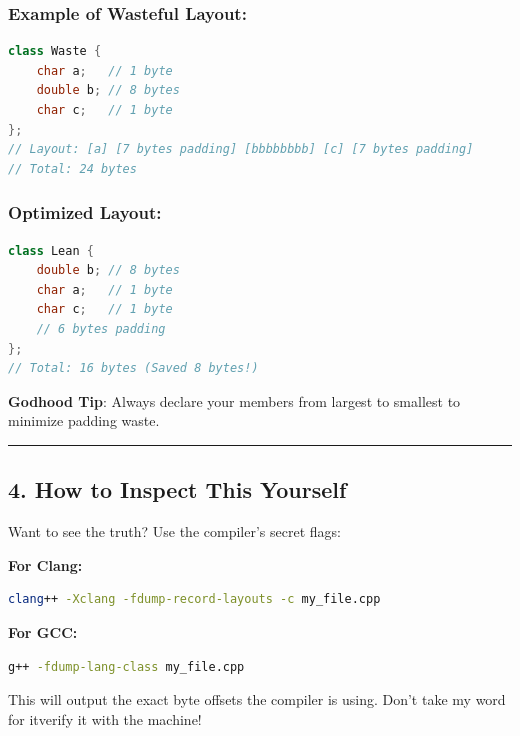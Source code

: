 \hypertarget{example-of-wasteful-layout}{%
\subsubsection{Example of Wasteful
Layout:}\label{example-of-wasteful-layout}}

\begin{lstlisting}[language={C++}]
class Waste {
    char a;   // 1 byte
    double b; // 8 bytes
    char c;   // 1 byte
};
// Layout: [a] [7 bytes padding] [bbbbbbbb] [c] [7 bytes padding]
// Total: 24 bytes
\end{lstlisting}

\hypertarget{optimized-layout}{%
\subsubsection{Optimized Layout:}\label{optimized-layout}}

\begin{lstlisting}[language={C++}]
class Lean {
    double b; // 8 bytes
    char a;   // 1 byte
    char c;   // 1 byte
    // 6 bytes padding
};
// Total: 16 bytes (Saved 8 bytes!)
\end{lstlisting}

\textbf{Godhood Tip}: Always declare your members from largest to
smallest to minimize padding waste.

\begin{center}\rule{0.5\linewidth}{0.5pt}\end{center}

\hypertarget{how-to-inspect-this-yourself}{%
\subsection{4. How to Inspect This
Yourself}\label{how-to-inspect-this-yourself}}

Want to see the truth? Use the compiler's secret flags:

\textbf{For Clang:}

\begin{lstlisting}[language=bash]
clang++ -Xclang -fdump-record-layouts -c my_file.cpp
\end{lstlisting}

\textbf{For GCC:}

\begin{lstlisting}[language=bash]
g++ -fdump-lang-class my_file.cpp
\end{lstlisting}

This will output the exact byte offsets the compiler is using. Don't
take my word for itverify it with the machine!
